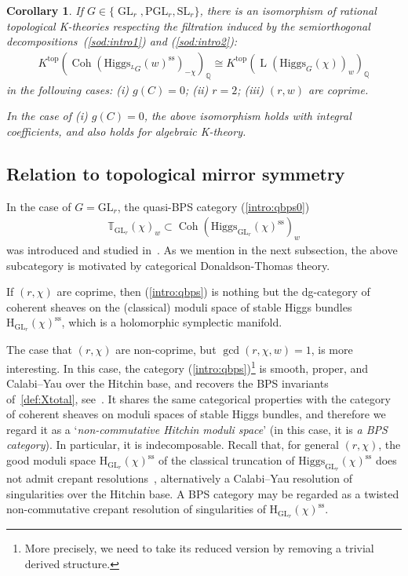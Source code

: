 \documentclass [11pt,oneside,a4paper,mathscr]{amsart}
\newtheorem{cor}[thm]{Corollary}
\theoremstyle{definition}
\newcommand{\LL}{\operatorname{L}}
\newcommand{\Coh}{\operatorname{Coh}}
\newcommand{\GL}{\operatorname{GL}}
\newcommand{\Hig}{\mathrm{Higgs}}
\begin{document}
\begin{cor}\label{intro:corK}
If $G \in \{\GL_r, \mathrm{PGL}_r, \mathrm{SL}_r\}$,  
there is an isomorphism of rational topological K-theories respecting the filtration induced by the semiorthogonal decompositions~(\ref{sod:intro1}) and (\ref{sod:intro2}): 
\begin{align*}
    K^{\mathrm{top}}(\Coh(\Hig_{^{L}G}(w)^{\mathrm{ss}})_{-\chi})_{\mathbb{Q}} \cong K^{\mathrm{top}}(\LL(\Hig_{G}(\chi))_w)_{\mathbb{Q}}
\end{align*}
in the following cases: 
(i) $g(C)=0$; (ii) $r=2$; (iii) $(r, w)$ are coprime. 

In the case of (i) $g(C)=0$, the above isomorphism holds with integral coefficients, 
and also holds for algebraic K-theory. 
\end{cor}

\subsection{Relation to topological mirror symmetry}\label{subsec:intro:catDT}



In the case of $G=\mathrm{GL}_r$, the quasi-BPS category (\ref{intro:qbps0})
\begin{align}\label{intro:qbps}
    \mathbb{T}_{\mathrm{GL}_r}(\chi)_w \subset \Coh(\Hig_{\mathrm{GL}_r}(\chi)^{\mathrm{ss}})_w
\end{align}
was introduced and studied in~\cite{PThiggs}. As we mention in the next subsection, the above subcategory 
is motivated by categorical Donaldson-Thomas theory. 

If $(r, \chi)$ are coprime, then (\ref{intro:qbps}) is nothing but the dg-category of coherent sheaves 
on the (classical) moduli space of stable Higgs bundles $\text{H}_{\GL_r}(\chi)^{\text{ss}}$, which is a holomorphic symplectic manifold. 

The case that $(r, \chi)$ are non-coprime, but $\gcd(r, \chi, w)=1$, is more interesting. 
In this case, the category (\ref{intro:qbps})\footnote{More precisely, we need to take its reduced version by removing a trivial derived structure.} is smooth, proper, and Calabi–Yau over the Hitchin 
base, and recovers the 
BPS invariants of~\eqref{def:Xtotal}, see~\cite{PThiggs}.
It shares the same categorical properties with the category of coherent sheaves on 
moduli spaces of stable Higgs bundles, and therefore we regard it as a `\textit{non-commutative Hitchin moduli space}' (in this case, it is
\textit{a BPS category}). In particular, it is indecomposable. 
Recall that, for general $(r,\chi)$, the good moduli space $\text{H}_{\GL_r}(\chi)^{\text{ss}}$ of the classical truncation of $\Hig_{\mathrm{GL}_r}(\chi)^{\text{ss}}$ does not admit crepant resolutions~\cite{KaLeSo}, alternatively a Calabi--Yau resolution of singularities over the Hitchin base. A BPS category may be regarded as a twisted non-commutative crepant resolution of singularities of $\text{H}_{\GL_r}(\chi)^{\text{ss}}$.
\end{document}
